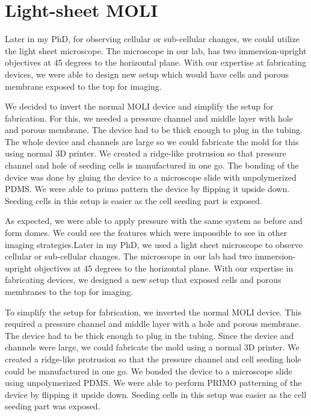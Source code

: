 \hypertarget{light-sheet-moli}{%
\section{Light-sheet MOLI}\label{light-sheet-moli}}

Later in my PhD, for observing cellular or sub-cellular changes, we
could utilize the light sheet microscope. The microscope in our lab, has
two immersion-upright objectives at 45 degrees to the horizontal plane.
With our expertise at fabricating devices, we were able to design new
setup which would have cells and porous membrane exposed to the top for
imaging.

We decided to invert the normal MOLI device and simplify the setup for
fabrication. For this, we needed a pressure channel and middle layer
with hole and porous membrane. The device had to be thick enough to plug
in the tubing. The whole device and channels are large so we could
fabricate the mold for this using normal 3D printer. We created a
ridge-like protrusion so that pressure channel and hole of seeding cells
is manufactured in one go. The bonding of the device was done by gluing
the device to a microscope slide with unpolymerized PDMS. We were able
to primo pattern the device by flipping it upside down. Seeding cells in
this setup is easier as the cell seeding part is exposed.

As expected, we were able to apply pressure with the same system as
before and form domes. We could see the features which were impossible
to see in other imaging strategies.Later in my PhD, we used a light sheet microscope to observe cellular or
sub-cellular changes. The microscope in our lab had two
immersion-upright objectives at 45 degrees to the horizontal plane. With
our expertise in fabricating devices, we designed a new setup that
exposed cells and porous membranes to the top for imaging.

To simplify the setup for fabrication, we inverted the normal MOLI
device. This required a pressure channel and middle layer with a hole
and porous membrane. The device had to be thick enough to plug in the
tubing. Since the device and channels were large, we could fabricate the
mold using a normal 3D printer. We created a ridge-like protrusion so
that the pressure channel and cell seeding hole could be manufactured in
one go. We bonded the device to a microscope slide using unpolymerized
PDMS. We were able to perform PRIMO patterning of the device by flipping
it upside down. Seeding cells in this setup was easier as the cell
seeding part was exposed.

